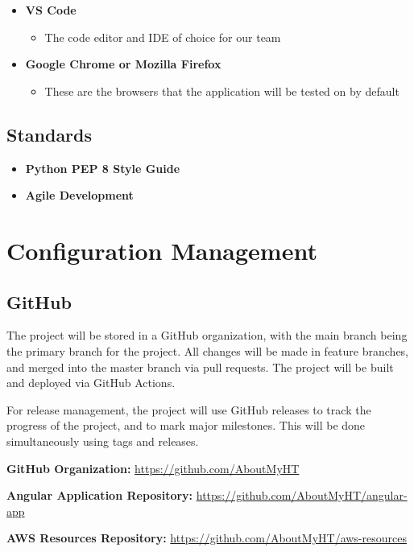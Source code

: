 \documentclass[12pt]{article}
\begin{document}
\begin{itemize}
    \item \textbf{VS Code}
          \begin{itemize}
              \item The code editor and IDE of choice for our team
          \end{itemize}
    \item \textbf{Google Chrome or Mozilla Firefox}
          \begin{itemize}
              \item These are the browsers that the application will be tested on by default
          \end{itemize}
\end{itemize}

\subsection{Standards}
\begin{itemize}
    \item \textbf{Python PEP 8 Style Guide}
    \item \textbf{Agile Development}
\end{itemize}

\section{Configuration Management}

\subsection{GitHub}
The project will be stored in a GitHub organization, with the main branch being the primary branch for the project. All changes will be made in feature branches, and merged into the master branch via pull requests. The project will be built and deployed via GitHub Actions.

For release management, the project will use GitHub releases to track the progress of the project, and to mark major milestones. This will be done simultaneously using tags and releases.

\textbf{GitHub Organization:} \href{https://github.com/AboutMyHT}{https://github.com/AboutMyHT}

\textbf{Angular Application Repository:} \href{https://github.com/AboutMyHT/angular-app}{https://github.com/AboutMyHT/angular-app}

\textbf{AWS Resources Repository:} \href{https://github.com/AboutMyHT/aws-resources}{https://github.com/AboutMyHT/aws-resources}
\end{document}
